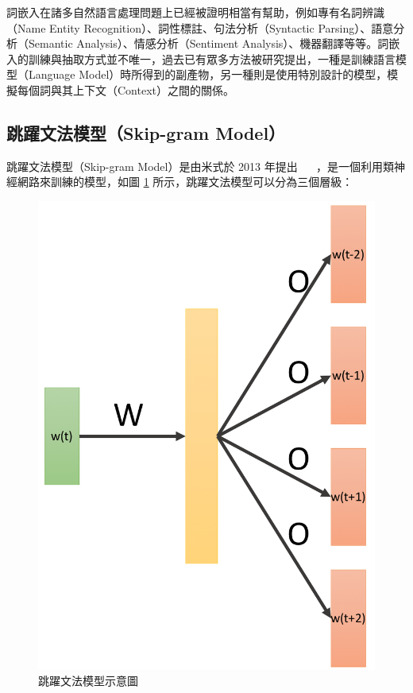 詞嵌入在諸多自然語言處理問題上已經被證明相當有幫助，例如專有名詞辨識（Name Entity Recognition）、詞性標註、句法分析（Syntactic Parsing）、語意分析（Semantic Analysis）、情感分析（Sentiment Analysis）、機器翻譯等等。詞嵌入的訓練與抽取方式並不唯一，過去已有眾多方法被研究提出，一種是訓練語言模型（Language Model）時所得到的副產物，另一種則是使用特別設計的模型，模擬每個詞與其上下文（Context）之間的關係。%
\subsection{跳躍文法模型（Skip-gram Model）}
跳躍文法模型（Skip-gram Model）是由米式於 2013 年提出 ~\cite{mikolov2013distributed}~\cite{mikolov2013efficient} ，是一個利用類神經網路來訓練的模型，如圖 \ref{fig:skip_gram} 所示，跳躍文法模型可以分為三個層級：
\begin{figure}[h]
    \centering
    \includegraphics[scale=0.35]{images/chap2_skipgram.png}
    \caption{跳躍文法模型示意圖 \cite{shen2016} }\label{fig:skip_gram}
\end{figure}
